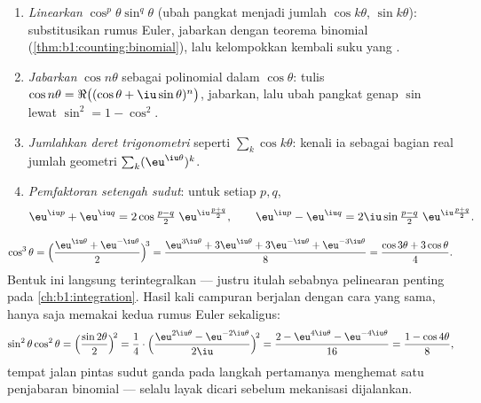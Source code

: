 \begin{method}\label{met:b1:complex:trig}
\begin{enumerate}
  \item \emph{Linearkan} $\cos^p\theta \sin^q\theta$ (ubah pangkat menjadi
        jumlah $\cos k\theta$, $\sin k\theta$): substitusikan rumus
        Euler, jabarkan dengan teorema binomial
        (\cref{thm:b1:counting:binomial}), lalu kelompokkan kembali suku yang .
  \item \emph{Jabarkan} $\cos n\theta$ sebagai polinomial dalam $\cos\theta$:
        tulis $\cos n\theta = \Re\bigl((\cos\theta +
        \iu\sin\theta)^n\bigr)$, jabarkan, lalu ubah pangkat genap
        $\sin$ lewat $\sin^2 = 1 - \cos^2$.
  \item \emph{Jumlahkan deret trigonometri} seperti $\sum_k \cos k\theta$:
        kenali ia sebagai bagian real jumlah geometri $\sum_k
        (\eu^{\iu\theta})^k$.
  \item \emph{Pemfaktoran setengah sudut}: untuk setiap $p, q$,
        \[
        \eu^{\iu p} + \eu^{\iu q}
        = 2 \cos\tfrac{p - q}{2}\; \eu^{\iu \frac{p+q}{2}},
        \qquad
        \eu^{\iu p} - \eu^{\iu q}
        = 2\iu \sin\tfrac{p - q}{2}\; \eu^{\iu \frac{p+q}{2}} .
        \]
\end{enumerate}
\end{method}

\begin{example}[Pelinearan]\label{ex:b1:complex:linearize}
\[
\cos^3\theta
= \Bigl(\frac{\eu^{\iu\theta} + \eu^{-\iu\theta}}{2}\Bigr)^{\!3}
= \frac{\eu^{3\iu\theta} + 3\eu^{\iu\theta} + 3\eu^{-\iu\theta} +
\eu^{-3\iu\theta}}{8}
= \frac{\cos 3\theta + 3\cos\theta}{4}.
\]
Bentuk ini langsung terintegralkan --- justru itulah sebabnya pelinearan
penting pada \cref{ch:b1:integration}. Hasil kali campuran berjalan
dengan cara yang sama, hanya saja memakai kedua rumus Euler sekaligus:
\[
\sin^2\theta\cos^2\theta
= \Bigl(\frac{\sin2\theta}2\Bigr)^{\!2}
= \frac{1}{4}\cdot
\Bigl(\frac{\eu^{2\iu\theta} - \eu^{-2\iu\theta}}{2\iu}
\Bigr)^{\!2}
= \frac{2 - \eu^{4\iu\theta} - \eu^{-4\iu\theta}}{16}
= \frac{1 - \cos4\theta}{8} ,
\]
tempat jalan pintas sudut ganda pada langkah pertamanya menghemat satu
penjabaran binomial --- selalu layak dicari sebelum
mekanisasi dijalankan.
\end{example}

